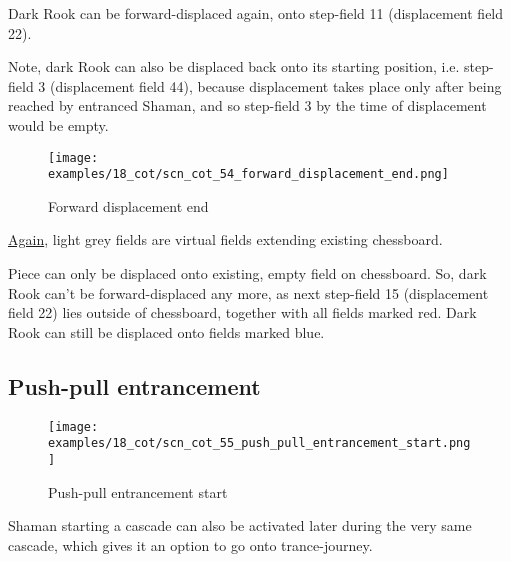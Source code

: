 Dark Rook can be forward-displaced again, onto step-field 11 (displacement field 22).

Note, dark Rook can also be displaced back onto its starting position, i.e. step-field
3 (displacement field 44), because displacement takes place only after being reached
by entranced Shaman, and so step-field 3 by the time of displacement would be empty.

\clearpage %

\noindent
\begin{figure}[!h]
\texttt{[image: examples/18\_cot/scn\_cot\_54\_forward\_displacement\_end.png]}
\caption{Forward displacement end}
\label{fig:scn_cot_54_forward_displacement_end}
\end{figure}

\hyperref[fig:scn_hd_06_centaur_off_board]{Again},
light grey fields are virtual fields extending existing chessboard.

Piece can only be displaced onto existing, empty field on chessboard. So, dark Rook
can't be forward-displaced any more, as next step-field 15 (displacement field 22)
lies outside of chessboard, together with all fields marked red. Dark Rook can still
be displaced onto fields marked blue.

\clearpage %

\subsection*{Push-pull entrancement}
\label{sec:Conquest of Tlalocan/Trance-journey/Push-pull entrancement}

\noindent
\begin{wrapfigure}[9]{l}{0.4\textwidth}
\centering
\texttt{[image: examples/18\_cot/scn\_cot\_55\_push\_pull\_entrancement\_start.png]}
\caption{Push-pull entrancement start}
\label{fig:star/scn_cot_55_push_pull_entrancement_start}
\end{wrapfigure}
Shaman starting a cascade can also be activated later during the very same cascade,
which gives it an option to go onto trance-journey.

